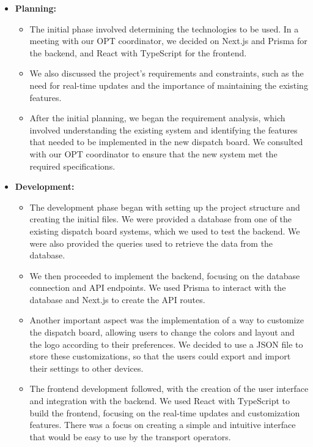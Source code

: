 \documentclass[10pt]{article}
\begin{document}
        \begin{itemize}
            \item \textbf{Planning:}
            \begin{itemize}
                \item     The initial phase involved determining the technologies to be used. In a meeting with our OPT coordinator, we decided on Next.js and Prisma for the backend, and React with TypeScript for the frontend.
                \item     We also discussed the project's requirements and constraints, such as the need for real-time updates and the importance of maintaining the existing features.
                \item     After the initial planning, we began the requirement analysis, which involved understanding the existing system and identifying the features that needed to be implemented in the new dispatch board. We consulted with our OPT coordinator to ensure that the new system met the required specifications.
            \end{itemize}
            \item \textbf{Development:}
            \begin{itemize}
                \item     The development phase began with setting up the project structure and creating the initial files. We were provided a database from one of the existing dispatch board systems, which we used to test the backend. We were also provided the queries used to retrieve the data from the database.
                \item     We then proceeded to implement the backend, focusing on the database connection and API endpoints. We used Prisma to interact with the database and Next.js to create the API routes.
                \item     Another important aspect was the implementation of a way to customize the dispatch board, allowing users to change the colors and layout and the logo according to their preferences. We decided to use a JSON file to store these customizations, so that the users could export and import their settings to other devices.
                \item     The frontend development followed, with the creation of the user interface and integration with the backend. We used React with TypeScript to build the frontend, focusing on the real-time updates and customization features. There was a focus on creating a simple and intuitive interface that would be easy to use by the transport operators.

\end{itemize}
\end{itemize}
\end{document}
